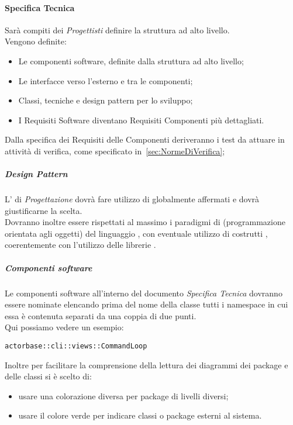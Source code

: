 \documentclass{scalatekids-article}
\begin{document}
\paragraph{Specifica Tecnica}

Sarà compiti dei \textit{Progettisti} definire la struttura ad alto livello.\\
Vengono definite:
\begin{itemize}
\item Le componenti software, definite dalla struttura ad alto livello;
\item Le interfacce verso l'esterno e tra le componenti;
\item Classi, tecniche e design pattern per lo sviluppo;
\item I Requisiti Software diventano Requisiti Componenti più dettagliati.
\end{itemize}

Dalla specifica dei Requisiti delle Componenti deriveranno i test da attuare in
attività di verifica, come specificato in~\ref{sec:NormeDiVerifica};


\subparagraph{Design Pattern}

L' di \textit{Progettazione} dovrà fare utilizzo di
 globalmente affermati e dovrà giustificarne la
scelta.\\Dovranno inoltre essere rispettati al massimo i paradigmi di
 (programmazione orientata agli oggetti) del linguaggio
, con eventuale utilizzo di costrutti ,
coerentemente con l'utilizzo delle librerie \textit{}.

\subparagraph{Componenti software}

Le componenti software all'interno del documento \textit{Specifica Tecnica}
dovranno essere nominate elencando prima del nome della classe tutti i namespace
in cui essa è contenuta separati da una coppia di due punti.\\ Qui possiamo
vedere un esempio:
\begin{center} \verb=actorbase::cli::views::CommandLoop=
\end{center} Inoltre per facilitare la comprensione della lettura dei diagrammi
dei package e delle classi si è scelto di:
\begin{itemize}
\item usare una colorazione diversa per package di livelli diversi;
\item usare il colore verde per indicare classi o package esterni al sistema.
\end{itemize}
\end{document}
